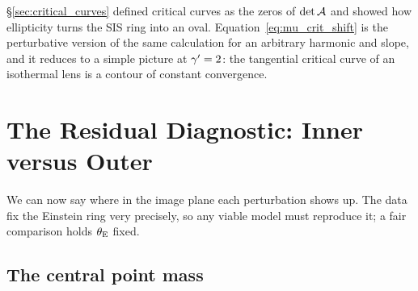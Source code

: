 \begin{bridge}
\S\ref{sec:critical_curves} defined critical curves as the zeros of
$\det\mathcal{A}$ and showed how ellipticity turns the SIS ring into an
oval.  Equation~\eqref{eq:mu_crit_shift} is the perturbative version
of the same calculation for an arbitrary harmonic and slope, and it
reduces to a simple picture at $\gamma'=2$: the tangential critical curve
of an isothermal lens is a contour of constant convergence.
\end{bridge}


\section{The Residual Diagnostic: Inner versus Outer}
\label{sec:mu_residuals}

We can now say where in the image plane each perturbation shows
up.  The data fix the Einstein ring very precisely, so any viable model
must reproduce it; a fair comparison holds $\theta_{\mathrm{E}}$ fixed.

\subsection{The central point mass}

